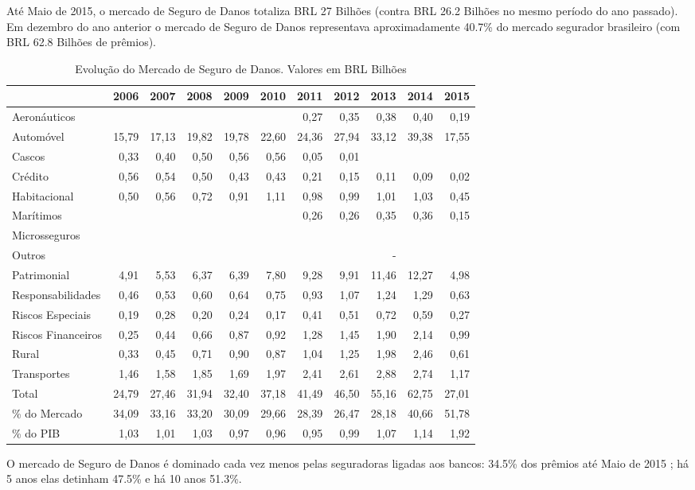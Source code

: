 \documentclass[../../relatorio.tex]{subfiles}
\begin{document}
Até Maio de 2015, o mercado de Seguro de Danos totaliza BRL 27 Bilhões (contra BRL 26.2 Bilhões no mesmo período do ano passado). Em dezembro do ano anterior o mercado de Seguro de Danos representava aproximadamente 40.7\% do mercado segurador brasileiro (com BRL 62.8 Bilhões de prêmios).

\pagebreak

\begin{table}[H]
\centering
\begin{tabular}{lrrrrrrrrrr}
  \hline
 & 2006 & 2007 & 2008 & 2009 & 2010 & 2011 & 2012 & 2013 & 2014 & 2015 \\ 
  \hline
Aeronáuticos &  &  &  &  &  & 0,27 & 0,35 & 0,38 & 0,40 & 0,19 \\ 
  Automóvel & 15,79 & 17,13 & 19,82 & 19,78 & 22,60 & 24,36 & 27,94 & 33,12 & 39,38 & 17,55 \\ 
  Cascos & 0,33 & 0,40 & 0,50 & 0,56 & 0,56 & 0,05 & 0,01 &  &  &  \\ 
  Crédito & 0,56 & 0,54 & 0,50 & 0,43 & 0,43 & 0,21 & 0,15 & 0,11 & 0,09 & 0,02 \\ 
  Habitacional & 0,50 & 0,56 & 0,72 & 0,91 & 1,11 & 0,98 & 0,99 & 1,01 & 1,03 & 0,45 \\ 
  Marítimos &  &  &  &  &  & 0,26 & 0,26 & 0,35 & 0,36 & 0,15 \\ 
  Microsseguros &  &  &  &  &  &  &  &  &  &  \\ 
  Outros &  &  &  &  &  &  &  & - &  &  \\ 
  Patrimonial & 4,91 & 5,53 & 6,37 & 6,39 & 7,80 & 9,28 & 9,91 & 11,46 & 12,27 & 4,98 \\ 
  Responsabilidades & 0,46 & 0,53 & 0,60 & 0,64 & 0,75 & 0,93 & 1,07 & 1,24 & 1,29 & 0,63 \\ 
  Riscos Especiais & 0,19 & 0,28 & 0,20 & 0,24 & 0,17 & 0,41 & 0,51 & 0,72 & 0,59 & 0,27 \\ 
  Riscos Financeiros & 0,25 & 0,44 & 0,66 & 0,87 & 0,92 & 1,28 & 1,45 & 1,90 & 2,14 & 0,99 \\ 
  Rural & 0,33 & 0,45 & 0,71 & 0,90 & 0,87 & 1,04 & 1,25 & 1,98 & 2,46 & 0,61 \\ 
  Transportes & 1,46 & 1,58 & 1,85 & 1,69 & 1,97 & 2,41 & 2,61 & 2,88 & 2,74 & 1,17 \\ 
   \hline
Total & 24,79 & 27,46 & 31,94 & 32,40 & 37,18 & 41,49 & 46,50 & 55,16 & 62,75 & 27,01 \\ 
   \hline
\% do Mercado & 34,09 & 33,16 & 33,20 & 30,09 & 29,66 & 28,39 & 26,47 & 28,18 & 40,66 & 51,78 \\ 
   \hline
\% do PIB & 1,03 & 1,01 & 1,03 & 0,97 & 0,96 & 0,95 & 0,99 & 1,07 & 1,14 & 1,92 \\ 
   \hline
\end{tabular}
\caption{Evolução do Mercado de Seguro de Danos. Valores em BRL Bilhões} 
\end{table}
O mercado de Seguro de Danos é dominado cada vez menos pelas seguradoras ligadas aos bancos: 34.5\% dos prêmios até Maio de 2015 ; há 5 anos elas detinham 47.5\% e há 10 anos 51.3\%.\\
\end{document}
